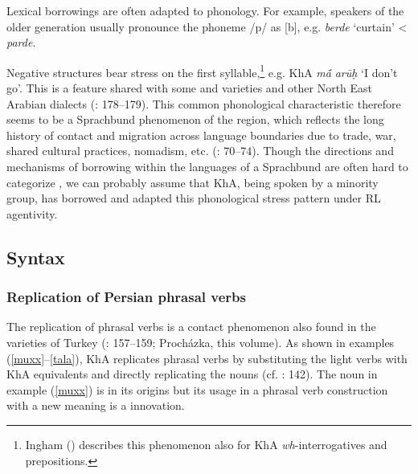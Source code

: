 \documentclass[output=paper,nonflat]{langsci/langscibook}
\begin{document}
Lexical borrowings are often adapted to  phonology. For example, speakers of the older generation usually pronounce the {phoneme} /p/ as [b], e.g. \textit{berde} ‘curtain’ <  \textit{parde}. 

Negative structures bear {stress} on the first syllable,\footnote{Ingham (\citeyear[724]{Ingham1991}) describes this phenomenon also for KhA \textit{wh}-interrogatives and {prepositions}.} e.g. KhA \textit{mā́} \textit{arūḥ} ‘I don’t go’. This is a feature shared with some  and  varieties and other North East Arabian dialects (\citealt{Ingham2005}: 178–179). This common phonological characteristic therefore seems to be a Sprachbund phenomenon of the  region, which reflects the long history of contact and migration across language boundaries due to trade, war, shared cultural practices, nomadism, etc. (\citealt{Winford2003}: 70–74). Though the directions and mechanisms of borrowing within the languages of a Sprachbund are often hard to categorize \citep[74]{Winford2003}, we can probably assume that KhA, being spoken by a minority group, has borrowed and adapted this phonological {stress} pattern under {RL} agentivity.



\subsection{Syntax}\largerpage
\subsubsection{Replication of Persian phrasal verbs}

The {replication} of phrasal verbs is a contact phenomenon also found in the  varieties of Turkey (\citealt{Grigore2007book}: 157–159; Procházka, this volume). As shown in examples (\ref{muxx}--\ref{tala}), KhA replicates  phrasal verbs by substituting the  {light verbs} with KhA equivalents and directly replicating the  nouns (cf. \citealt{MatrasShabibi2007}: 142). The noun in example (\ref{muxx}) is  in its origins but its usage in a phrasal verb construction with a new meaning is a  innovation.
\end{document}
